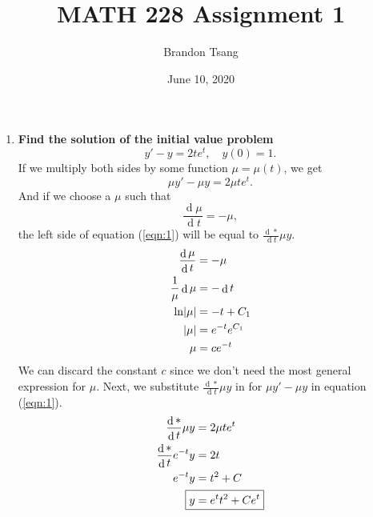 \documentclass[11pt]{article}
\title{MATH 228 Assignment 1}
\author{Brandon Tsang}
\date{June 10, 2020}
\DeclareMathOperator{\diff}{d}
\newcommand\dd[2]{\frac{\diff #1}{\diff #2}}
\DeclarePairedDelimiter\abs{\lvert}{\rvert}
\begin{document}
    \maketitle
    \begin{enumerate}[label=\textbf{\arabic*.}]
        \item{
            \textbf{\boldmath Find the solution of the initial value problem \[y'-y=2te^t,\quad y(0)=1.\]}%
            If we multiply both sides by some function \(\mu=\mu(t)\), we get
            \begin{equation}
                \label{eqn:1}
                \mu y'-\mu y=2\mu te^t.
            \end{equation}
            And if we choose a \(\mu\) such that \[\dd{\mu}{t}=-\mu,\] the left side of equation (\ref{eqn:1}) will be equal to \(\dd*{t}\mu y\).
            \begin{align*}
                \dd{\mu}{t}&=-\mu \\
                \frac 1 \mu \diff\mu&=-\diff t \\
                \ln\abs{\mu}&=-t+C_1 \\
                \abs\mu&=e^{-t}e^{C_1} \\
                \mu&=ce^{-t}
            \end{align*}
            We can discard the constant \(c\) since we don't need the most general expression for \(\mu\). Next, we substitute \(\dd*{t}\mu y\) in for \(\mu y'-\mu y\) in equation (\ref{eqn:1}).
            \begin{align*}
                \dd*{t}\mu y&=2\mu te^t \\
                \dd*{t}e^{-t}y&=2t \\
                e^{-t}y&=t^2+C \\
                \Aboxed{y&=e^tt^2+Ce^t}
            \end{align*}
        }
    \end{enumerate}
\end{document}
